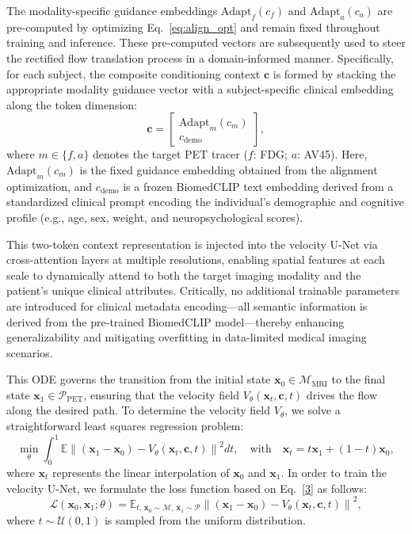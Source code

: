 \documentclass[a4paper]{cas-sc}
\begin{document}
The modality-specific guidance embeddings $\text{Adapt}_f(c_f)$ and $\text{Adapt}_a(c_a)$ are pre-computed by optimizing Eq.~\eqref{eq:align_opt} and remain fixed throughout training and inference. These pre-computed vectors are subsequently used to steer the rectified flow translation process in a domain-informed manner. Specifically, for each subject, the composite conditioning context $\mathbf{c} $ is formed by stacking the appropriate modality guidance vector with a subject-specific clinical embedding along the token dimension:
\begin{equation}
\mathbf{c} = 
\begin{bmatrix}
\text{Adapt}_m(c_m) \\
c_{\text{demo}}
\end{bmatrix}
,
\label{eq:composite_conditioning}
\end{equation}
where $m \in \{f, a\}$ denotes the target PET tracer ($f$: FDG; $a$: AV45). Here, $\text{Adapt}_m(c_m)$ is the fixed guidance embedding obtained from the alignment optimization, and $c_{\text{demo}} $ is a frozen BiomedCLIP text embedding derived from a standardized clinical prompt encoding the individual’s demographic and cognitive profile (e.g., age, sex, weight, and neuropsychological scores).

This two-token context representation is injected into the velocity U-Net via cross-attention layers at multiple resolutions, enabling spatial features at each scale to dynamically attend to both the target imaging modality and the patient’s unique clinical attributes. Critically, no additional trainable parameters are introduced for clinical metadata encoding—all semantic information is derived from the pre-trained BiomedCLIP model—thereby enhancing generalizability and mitigating overfitting in data-limited medical imaging scenarios.

This ODE governs the transition from the initial state $\mathbf{x}_0 \in \mathcal{M}_{\text{MRI}}$ to the final state $\mathbf{x}_1 \in \mathcal{P}_{\text{PET}}$, ensuring that the velocity field $V_\theta(\mathbf{x}_t, \mathbf{c}, t)$ drives the flow along the desired path. To determine the velocity field $V_\theta$, we solve a straightforward least squares regression problem:
\begin{equation}
\min_{\theta} \int_0^1 \mathbb{E} \left\| (\mathbf{x}_1 - \mathbf{x}_0) - V_\theta(\mathbf{x}_t, \mathbf{c}, t) \right\|^2 dt, \quad \text{with} \quad \mathbf{x}_t = t\mathbf{x}_1 + (1-t)\mathbf{x}_0,
\label{3}
\end{equation}
where $\mathbf{x}_t$ represents the linear interpolation of $\mathbf{x}_0$ and $\mathbf{x}_1$. In order to train the velocity U-Net, we formulate the loss function based on Eq.~\eqref{3} as follows:
\begin{equation}
\mathcal{L}(\mathbf{x}_0, \mathbf{x}_1; \theta) = \mathbb{E}_{t,\, \mathbf{x}_0 \sim \mathcal{M},\, \mathbf{x}_1 \sim \mathcal{P}} \left\| (\mathbf{x}_1 - \mathbf{x}_0) - V_\theta(\mathbf{x}_t, \mathbf{c}, t) \right\|^2,
\end{equation}
where $t \sim \mathcal{U}(0, 1)$ is sampled from the uniform distribution.
\end{document}
